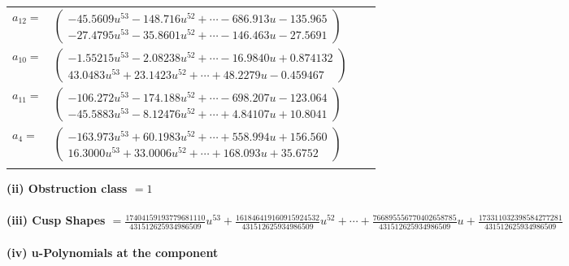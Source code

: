 \documentclass[1p]{elsarticle_modified}
\theoremstyle{definition}
\begin{document}
\begin{tabular}{m{7pt} m{180pt} m{7pt} m{180pt} }
\flushright $a_{12}=$&$\begin{pmatrix}-45.5609 u^{53}-148.716 u^{52}+\cdots-686.913 u-135.965\\-27.4795 u^{53}-35.8601 u^{52}+\cdots-146.463 u-27.5691\end{pmatrix}$ \\
\flushright $a_{10}=$&$\begin{pmatrix}-1.55215 u^{53}-2.08238 u^{52}+\cdots-16.9840 u+0.874132\\43.0483 u^{53}+23.1423 u^{52}+\cdots+48.2279 u-0.459467\end{pmatrix}$ \\
\flushright $a_{11}=$&$\begin{pmatrix}-106.272 u^{53}-174.188 u^{52}+\cdots-698.207 u-123.064\\-45.5883 u^{53}-8.12476 u^{52}+\cdots+4.84107 u+10.8041\end{pmatrix}$ \\
\flushright $a_{4}=$&$\begin{pmatrix}-163.973 u^{53}+60.1983 u^{52}+\cdots+558.994 u+156.560\\16.3000 u^{53}+33.0006 u^{52}+\cdots+168.093 u+35.6752\end{pmatrix}$\\&\end{tabular}
\flushleft \textbf{(ii) Obstruction class $= 1$}\\~\\
\flushleft \textbf{(iii) Cusp Shapes $= \frac{17404159193779681110}{431512625934986509} u^{53}+\frac{161846419160915924532}{431512625934986509} u^{52}+\cdots+\frac{766895556770402658785}{431512625934986509} u+\frac{173311032398584277281}{431512625934986509}$}\\~\\
\newpage\renewcommand{\arraystretch}{1}
\flushleft \textbf{(iv) u-Polynomials at the component}\newline \\
\end{document}
